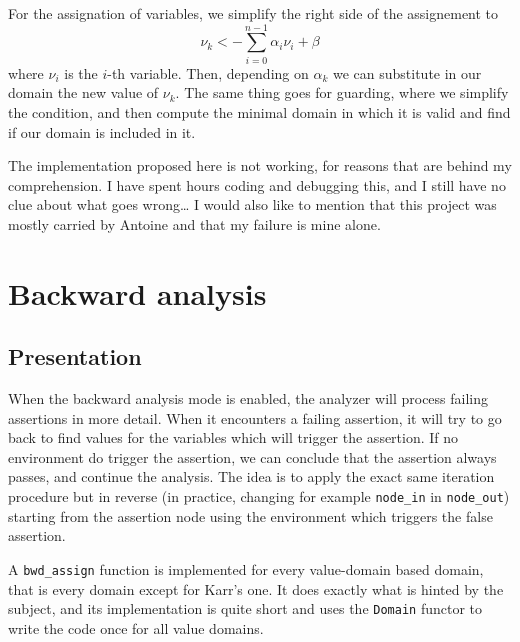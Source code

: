 \documentclass[12pt,a4paper]{article}
\begin{document}
For the assignation of variables, we simplify the right side of the assignement to
\begin{equation*}
    \nu_{k} <- \sum_{i = 0}^{n - 1}\alpha_{i}\nu_{i} + \beta
\end{equation*}
where $\nu_{i}$ is the $i$-th variable.
Then, depending on $\alpha_{k}$ we can substitute in our domain the new value of $\nu_{k}$.
The same thing goes for guarding, where we simplify the condition, and then compute the minimal domain in which it is valid and find if our domain is included in it.

The implementation proposed here is not working, for reasons that are behind my comprehension. I have spent hours coding and debugging this, and I still have no clue about what goes wrong\dots
I would also like to mention that this project was mostly carried by Antoine and that my failure is mine alone.

\section{Backward analysis}
\subsection{Presentation}
When the backward analysis mode is enabled, the analyzer will process failing assertions in more detail. When it encounters a failing assertion, it will try to go back to find values for the variables which will trigger the assertion. If no environment do trigger the assertion, we can conclude that the assertion always passes, and continue the analysis. The idea is to apply the exact same iteration procedure but in reverse (in practice, changing for example \texttt{node\_in} in \texttt{node\_out}) starting from the assertion node using the environment which triggers the false assertion.

A \texttt{bwd\_assign} function is implemented for every value-domain based domain, that is every domain except for Karr's one. It does exactly what is hinted by the subject, and its implementation is quite short and uses the \texttt{Domain} functor to write the code once for all value domains.
\end{document}
